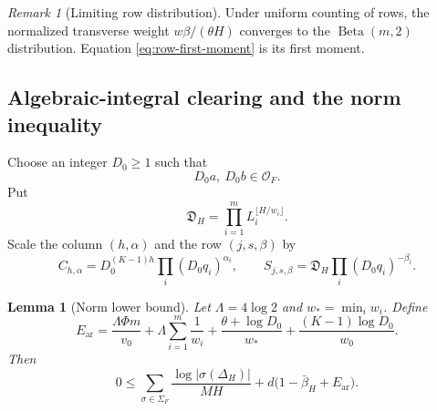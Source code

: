 \documentclass[11pt]{article}
\newcommand{\OO}{\mathcal O}
\newtheorem{lemma}[theorem]{Lemma}
\theoremstyle{definition}
\theoremstyle{remark}
\newtheorem{remark}[theorem]{Remark}
\numberwithin{equation}{section}
\begin{document}
\begin{remark}[Limiting row distribution]\label{rem:row-beta}
Under uniform counting of rows, the normalized transverse weight
$w\beta/(\theta H)$ converges to the $\operatorname{Beta}(m,2)$
distribution.  Equation \eqref{eq:row-first-moment} is its first moment.
\end{remark}

\subsection{Algebraic-integral clearing and the norm inequality}

Choose an integer $D_0\ge1$ such that
\[
 D_0a,\ D_0b\in\OO_F.
\]
Put
\[
 \mathfrak D_H=\prod_{i=1}^mL_i^{\lfloor H/w_i\rfloor}.
\]
Scale the column $(h,\alpha)$ and the row $(j,s,\beta)$ by
\begin{equation}\label{eq:scales}
 C_{h,\alpha}=D_0^{(K-1)h}\prod_i(D_0q_i)^{\alpha_i},
 \qquad
 S_{j,s,\beta}=\mathfrak D_H\prod_i(D_0q_i)^{-\beta_i}.
\end{equation}

\begin{lemma}[Norm lower bound]\label{lem:norm}
Let $\Lambda=4\log2$ and $w_*=\min_iw_i$.  Define
\begin{equation}\label{eq:Ear}
 E_{\mathrm{ar}}=
 \frac{\Lambda\Phi m}{v_0}
 +\Lambda\sum_{i=1}^m\frac1{w_i}
 +\frac{\theta+\log D_0}{w_*}
 +\frac{(K-1)\log D_0}{w_0}.
\end{equation}
Then
\begin{equation}\label{eq:norm-inequality}
 0\le
 \sum_{\sigma\in\Sigma_F}
 \frac{\log|\sigma(\Delta_H)|}{MH}
 +d\bigl(1-\bar\beta_H+E_{\mathrm{ar}}\bigr).
\end{equation}
\end{lemma}
\end{document}
